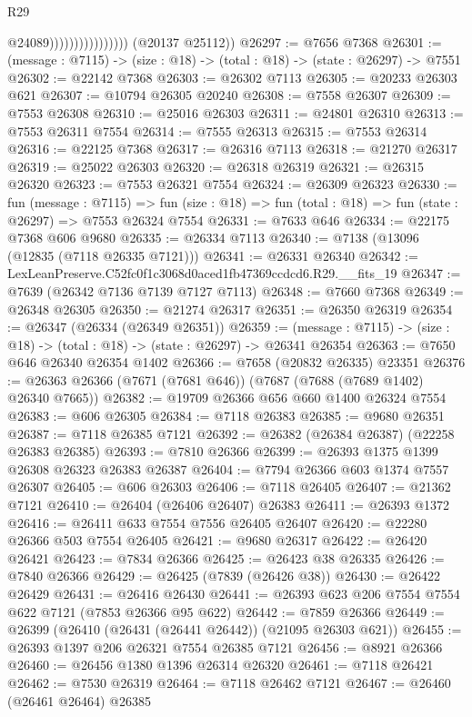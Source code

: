 \begin{lexlean}{R29}
\begin{coremodule}
                                      @24089))))))))))))))))
      (@20137 @25112))
@26297 := @7656 @7368
@26301 := (message : @7115) -> (size : @18) -> (total : @18) -> (state : @26297) -> @7551
@26302 := @22142 @7368
@26303 := @26302 @7113
@26305 := @20233 @26303 @621
@26307 := @10794 @26305 @20240
@26308 := @7558 @26307
@26309 := @7553 @26308
@26310 := @25016 @26303
@26311 := @24801 @26310
@26313 := @7553 @26311 @7554
@26314 := @7555 @26313
@26315 := @7553 @26314
@26316 := @22125 @7368
@26317 := @26316 @7113
@26318 := @21270 @26317
@26319 := @25022 @26303
@26320 := @26318 @26319
@26321 := @26315 @26320
@26323 := @7553 @26321 @7554
@26324 := @26309 @26323
@26330 := fun (message : @7115) =>
  fun (size : @18) => fun (total : @18) => fun (state : @26297) => @7553 @26324 @7554
@26331 := @7633 @646
@26334 := @22175 @7368 @606 @9680
@26335 := @26334 @7113
@26340 := @7138 (@13096 (@12835 (@7118 @26335 @7121)))
@26341 := @26331 @26340
@26342 := LexLeanPreserve.C52fc0f1c3068d0aced1fb47369ccdcd6.R29.__fits_19
@26347 := @7639 (@26342 @7136 @7139 @7127 @7113)
@26348 := @7660 @7368
@26349 := @26348 @26305
@26350 := @21274 @26317
@26351 := @26350 @26319
@26354 := @26347 (@26334 (@26349 @26351))
@26359 := (message : @7115) -> (size : @18) -> (total : @18) -> (state : @26297) -> @26341 @26354
@26363 := @7650 @646 @26340 @26354 @1402
@26366 := @7658 (@20832 @26335) @23351
@26376 := @26363 @26366 (@7671 (@7681 @646)) (@7687 (@7688 (@7689 @1402) @26340 @7665))
@26382 := @19709 @26366 @656 @660 @1400 @26324 @7554
@26383 := @606 @26305
@26384 := @7118 @26383
@26385 := @9680 @26351
@26387 := @7118 @26385 @7121
@26392 := @26382 (@26384 @26387) (@22258 @26383 @26385)
@26393 := @7810 @26366
@26399 := @26393 @1375 @1399 @26308 @26323 @26383 @26387
@26404 := @7794 @26366 @603 @1374 @7557 @26307
@26405 := @606 @26303
@26406 := @7118 @26405
@26407 := @21362 @7121
@26410 := @26404 (@26406 @26407) @26383
@26411 := @26393 @1372
@26416 := @26411 @633 @7554 @7556 @26405 @26407
@26420 := @22280 @26366 @503 @7554 @26405
@26421 := @9680 @26317
@26422 := @26420 @26421
@26423 := @7834 @26366
@26425 := @26423 @38 @26335
@26426 := @7840 @26366
@26429 := @26425 (@7839 (@26426 @38))
@26430 := @26422 @26429
@26431 := @26416 @26430
@26441 := @26393 @623 @206 @7554 @7554 @622 @7121 (@7853 @26366 @95 @622)
@26442 := @7859 @26366
@26449 := @26399 (@26410 (@26431 (@26441 @26442)) (@21095 @26303 @621))
@26455 := @26393 @1397 @206 @26321 @7554 @26385 @7121
@26456 := @8921 @26366
@26460 := @26456 @1380 @1396 @26314 @26320
@26461 := @7118 @26421
@26462 := @7530 @26319
@26464 := @7118 @26462 @7121
@26467 := @26460 (@26461 @26464) @26385

\end{coremodule}
\end{lexlean}
